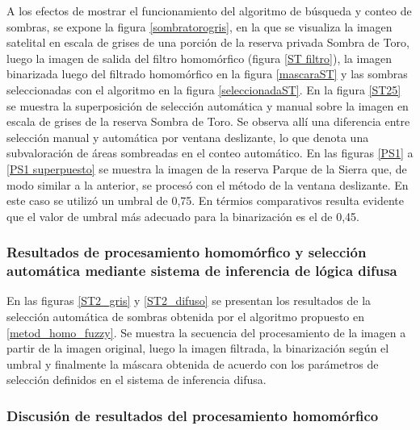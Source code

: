 A los efectos de mostrar el funcionamiento del algoritmo de búsqueda y conteo de sombras, se expone la figura \ref{sombratorogris}, en la que se visualiza la imagen satelital en escala de grises de una porción de la reserva privada Sombra de Toro, luego la imagen de salida del filtro homomórfico (figura \ref{ST filtro}), la imagen binarizada luego del filtrado homomórfico en la figura \ref{mascaraST} y las sombras seleccionadas con el algoritmo en la figura \ref{seleccionadaST}. En la figura \ref{ST25} se muestra la superposición de selección automática y manual sobre la imagen en escala de grises de la reserva Sombra de Toro. Se observa allí una diferencia entre selección manual y automática por ventana deslizante, lo que denota una subvaloración de áreas sombreadas en el conteo automático.
En las figuras \ref{PS1} a \ref{PS1 superpuesto} se muestra la imagen de la reserva Parque de la Sierra que, de modo similar a la anterior, se procesó con el método de la ventana deslizante. En este caso se utilizó un umbral de 0,75. En térmios comparativos resulta evidente que el valor de umbral más adecuado para la binarización es el de 0,45.




\subsubsection{Resultados de procesamiento homomórfico y selección automática mediante sistema de inferencia de lógica difusa} \label{resultados homo difusa}
En las figuras \ref{ST2_gris} y \ref{ST2_difuso} se presentan los resultados de la selección automática de sombras obtenida por el algoritmo propuesto en \ref{metod_homo_fuzzy}.
Se muestra la secuencia del procesamiento de la imagen a partir de la imagen original, luego la imagen filtrada, la binarización según el umbral y finalmente la máscara obtenida de acuerdo con los parámetros de selección definidos en el sistema de inferencia difusa.



\subsubsection{Discusión de resultados del procesamiento homomórfico}

